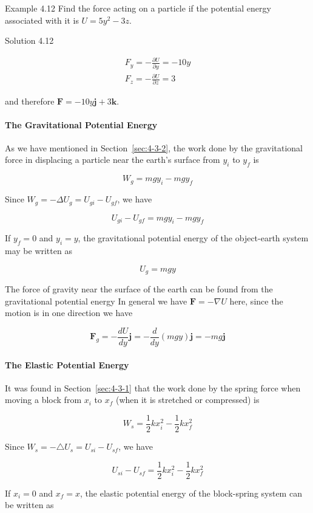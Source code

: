 \documentclass[10pt]{article}
\numberwithin{equation}{section}
\begin{document}
Example 4.12 Find the force acting on a particle if the potential energy associated with it is $U=5 y^{2}-3 z$.

Solution 4.12

$$
\begin{gathered}
F_{y}=-\frac{\partial U}{\partial y}=-10 y \\
F_{z}=-\frac{\partial U}{\partial z}=3
\end{gathered}
$$

and therefore $\mathbf{F}=-10 y \mathbf{j}+3 \mathbf{k}$.

\paragraph{The Gravitational Potential Energy}\label{sec:4-4-1-1}
As we have mentioned in Section~\ref{sec:4-3-2}, the work done by the gravitational force in displacing a particle near the earth's surface from $y_{i}$ to $y_{f}$ is

$$
W_{g}=m g y_{i}-m g y_{f}
$$

Since $W_{g}=-\Delta U_{g}=U_{g i}-U_{g f}$, we have

$$
U_{g i}-U_{g f}=m g y_{i}-m g y_{f}
$$

If $y_{f}=0$ and $y_{i}=y$, the gravitational potential energy of the object-earth system may be written as

$$
U_{g}=m g y
$$

The force of gravity near the surface of the earth can be found from the gravitational potential energy In general we have $\mathbf{F}=-\nabla U$ here, since the motion is in one direction we have

$$
\mathbf{F}_{g}=-\frac{d U}{d y} \mathbf{j}=-\frac{d}{d y}(m g y) \mathbf{j}=-m g \mathbf{j}
$$

\paragraph{The Elastic Potential Energy}\label{sec:4-4-1-2}
It was found in Section~\ref{sec:4-3-1} that the work done by the spring force when moving a block from $x_{i}$ to $x_{f}$ (when it is stretched or compressed) is

$$
W_{s}=\frac{1}{2} k x_{i}^{2}-\frac{1}{2} k x_{f}^{2}
$$

Since $W_{s}=-\triangle U_{s}=U_{s i}-U_{s f}$, we have

$$
U_{s i}-U_{s f}=\frac{1}{2} k x_{i}^{2}-\frac{1}{2} k x_{f}^{2}
$$

If $x_{i}=0$ and $x_{f}=x$, the elastic potential energy of the block-spring system can be written as
\end{document}
